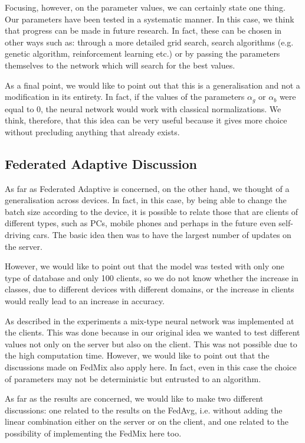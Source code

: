 \documentclass[conference]{IEEEtran}
\begin{document}
Focusing, however, on the parameter values, we can certainly state one thing. Our parameters have been tested in a systematic manner. In this case, we think that progress can be made in future research. In fact, these can be chosen in other ways such as: through a more detailed grid search, search algorithms (e.g. genetic algorithm, reinforcement learning etc.) or by passing the parameters themselves to the network which will search for the best values.

As a final point, we would like to point out that this is a generalisation and not a modification in its entirety. In fact, if the values of the parameters $\alpha_g$ or $\alpha_b$ were equal to 0, the neural network would work with classical normalizations. We think, therefore, that this idea can be very useful because it gives more choice without precluding anything that already exists.

\subsection{Federated Adaptive Discussion}
As far as Federated Adaptive is concerned, on the other hand, we thought of a generalisation across devices. In fact, in this case, by being able to change the batch size according to the device, it is possible to relate those that are clients of different types, such as PCs, mobile phones and perhaps in the future even self-driving cars. The basic idea then was to have the largest number of updates on the server. 

However, we would like to point out that the model was tested with only one type of database and only 100 clients, so we do not know whether the increase in classes, due to different devices with different domains, or the increase in clients would really lead to an increase in accuracy.

As described in the experiments a mix-type neural network was implemented at the clients. This was done because in our original idea we wanted to test different values not only on the server but also on the client. This was not possible due to the high computation time. However, we would like to point out that the discussions made on FedMix also apply here. In fact, even in this case the choice of parameters may not be deterministic but entrusted to an algorithm.

As far as the results are concerned, we would like to make two different discussions: one related to the results on the FedAvg, i.e. without adding the linear combination either on the server or on the client, and one related to the possibility of implementing the FedMix here too.
\end{document}
